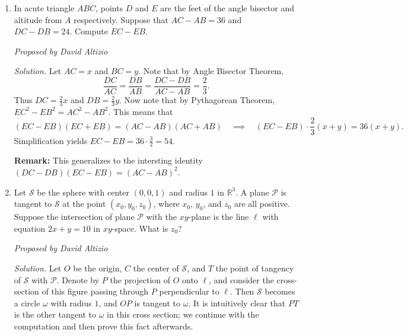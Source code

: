 \documentclass[10pt]{article}
\newcommand{\proposed}[1]
{
\vspace{5pt}
\noindent\textit{Proposed by #1}
}
\newcommand{\solution}
{
\vspace{5pt}
\noindent\textit{Solution.}\qquad
}
\begin{document}
\begin{enumerate}
\item In acute triangle $ABC$, points $D$ and $E$ are the feet of the angle bisector and altitude from $A$ respectively.  Suppose that $AC - AB = 36$ and $DC - DB = 24$.  Compute $EC - EB$.

\proposed{David Altizio}

\solution Let $AC=x$ and $BC=y$.  Note that by Angle Bisector Theorem, \[\dfrac{DC}{AC} = \dfrac{DB}{AB} = \dfrac{DC-DB}{AC-AB} = \dfrac23.\] Thus $DC=\tfrac23x$ and $DB=\tfrac23y$.  Now note that by Pythagorean Theorem, $EC^2-EB^2=AC^2-AB^2$.  This means that \[(EC-EB)(EC+EB) = (AC-AB)(AC+AB)\quad\implies\quad (EC-EB)\cdot\dfrac23(x+y) = 36(x+y).\] Simplification yields $EC-EB=36\cdot\frac32 = \boxed{54}$.

\par\textbf{Remark: }This generalizes to the intersting identity $(DC-DB)(EC-EB)=(AC-AB)^2$.


\item Let $\mathcal S$ be the sphere with center $(0,0,1)$ and radius $1$ in $\mathbb R^3$.  A plane $\mathcal P$ is tangent to $\mathcal S$ at the point $(x_0,y_0,z_0)$, where $x_0$, $y_0$, and $z_0$ are all positive.  Suppose the intersection of plane $\mathcal P$ with the $xy$-plane is the line $\ell$ with equation $2x+y=10$ in $xy$-space.  What is $z_0$?

\proposed{David Altizio}

\solution Let $O$ be the origin, $C$ the center of $\mathcal S$, and $T$ the point of tangency of $\mathcal S$ with $\mathcal P$.  Denote by $P$ the projection of $O$ onto $\ell$, and consider the cross-section of this figure passing through $P$ perpendicular to $\ell$.  Then $\mathcal S$ becomes a circle $\omega$ with radius $1$, and $OP$ is tangent to $\omega$.  It is intuitively clear that $PT$ is the other tangent to $\omega$ in this cross section; we continue with the computation and then prove this fact afterwards.


\end{enumerate}
\end{document}
